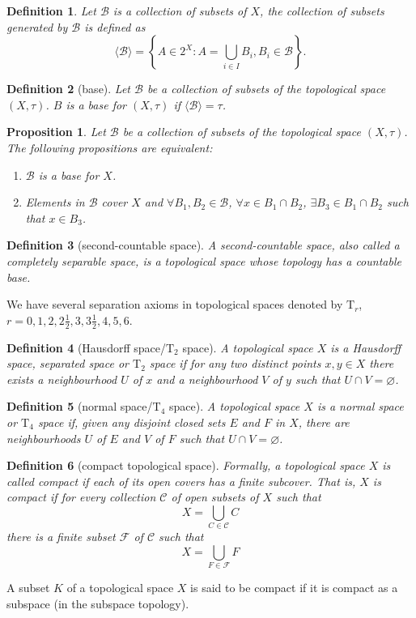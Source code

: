 \documentclass{report}
\newtheorem{definition}{Definition}[section]
\newtheorem{proposition}{Proposition}[section]
\theoremstyle{nonumberplain}
\begin{document}
\begin{definition}
	Let $\mathcal{B}$ is a collection of subsets of $X$, the collection of subsets generated by $\mathcal{B}$ is defined as
	\[
	\langle\mathcal{B}\rangle=\left\{A\in 2^X:A=\bigcup_{i\in I} B_i,B_i\in\mathcal{B}\right\}.
	\]
\end{definition}
\begin{definition}[base]
	 Let $\mathcal{B}$ be a collection of subsets of the topological space $(X,\tau)$. $B$ is a \emph{base} for $(X,\tau)$ if 
	 $\langle\mathcal{B}\rangle=\tau$.
\end{definition}
\begin{proposition}
	Let $\mathcal{B}$ be a collection of subsets of the topological space $(X,\tau)$. The following propositions are equivalent:
	\begin{enumerate}
		\item $\mathcal{B}$ is a base for $X$. 
		\item Elements in $\mathcal{B}$ cover $X$ and $\forall B_1,B_2\in\mathcal{B}$, $\forall x\in B_1\cap B_2$, $\exists B_3\in B_1\cap B_2$ such that $x\in B_3$.
	\end{enumerate}
\end{proposition}
\begin{definition}[second-countable space]
	A \emph{second-countable} space, also called a completely separable space, is a topological space whose topology has a countable base. 
\end{definition}

We have several separation axioms in topological spaces denoted by $\mathrm{T}_r$, $r=0,1,2,2\frac{1}{2},3,3\frac{1}{2},4,5,6$.
\begin{definition}[Hausdorff space/$\mathrm{T}_2$ space]
	A topological space $X$ is a \emph{Hausdorff space}, separated space or $\mathrm{T}_2$ space if for any two distinct points $x,y\in X$ there exists a neighbourhood $U$ of $x$ and a neighbourhood $V$ of $y$ such that $U\cap V=\varnothing$. 
\end{definition}
\begin{definition}[normal space/$\mathrm{T}_4$ space]
	A topological space $X$ is a \emph{normal space} or $\mathrm{T}_4$ space if, given any disjoint closed sets $E$ and $F$ in $X$, there are neighbourhoods $U$ of $E$ and $V$ of $F$ such that $U\cap V=\varnothing$. 
\end{definition}

\begin{definition}[compact topological space]
	Formally, a topological space $X$ is called \emph{compact} if each of its open covers has a finite subcover. That is, $X$ is compact if for every collection $\mathcal{C}$ of open subsets of $X$ such that
	\[
	X=\bigcup_{C \in \mathcal{C}} C
	\]
	there is a finite subset $\mathcal{F}$ of $\mathcal{C}$ such that
	\[
	X=\bigcup_{F \in \mathcal{F}} F
	\]
\end{definition}
A subset $K$ of a topological space $X$ is said to be compact if it is compact as a subspace (in the subspace topology).
\end{document}
